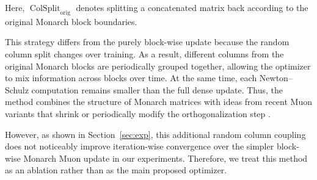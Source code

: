 \documentclass{article}
\begin{document}
Here, \(\operatorname{ColSplit}_{\mathrm{orig}}\) denotes splitting a concatenated matrix back according to the original Monarch block boundaries.

This strategy differs from the purely block-wise update because the random column split changes over training. As a result, different columns from the original Monarch blocks are periodically grouped together, allowing the optimizer to mix information across blocks over time. At the same time, each Newton--Schulz computation remains smaller than the full dense update. Thus, the method combines the structure of Monarch matrices \cite{dao2022monarchexpressivestructuredmatrices} with ideas from recent Muon variants that shrink or periodically modify the orthogonalization step \cite{ahn2025dion2simplemethodshrink,khaled2025muonbpfastermuonblockperiodic}.

However, as shown in Section~\ref{sec:exp}, this additional random column coupling does not noticeably improve iteration-wise convergence over the simpler block-wise Monarch Muon update in our experiments. Therefore, we treat this method as an ablation rather than as the main proposed optimizer.
\end{document}
